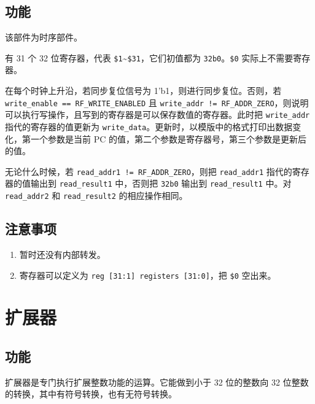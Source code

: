 \documentclass[12pt,AutoFakeBold,AutoFakeSlant]{article}
\providecommand{\tightlist}{%
  \setlength{\itemsep}{0pt}\setlength{\parskip}{0pt}}
\begin{document}
\hypertarget{ux529fux80fd-4}{%
\subsection{功能}\label{ux529fux80fd-4}}

该部件为时序部件。

有 31 个 32 位寄存器，代表
\texttt{\$1}\textasciitilde{}\texttt{\$31}，它们初值都为 \texttt{32\textquotesingle{}b0}。\texttt{\$0} 实际上不需要寄存器。

在每个时钟上升沿，若同步复位信号为 1'b1，则进行同步复位。否则，若 \texttt{write\_enable\ ==\ RF\_WRITE\_ENABLED} 且
\texttt{write\_addr\ !=\ RF\_ADDR\_ZERO}，则说明可以执行写操作，且写到的寄存器是可以保存数值的寄存器。此时把
\texttt{write\_addr} 指代的寄存器的值更新为
\texttt{write\_data}。更新时，以模版中的格式打印出数据变化，第一个参数是当前 PC 的值，第二个参数是寄存器号，第三个参数是更新后的值。

无论什么时候，若 \texttt{read\_addr1\ !=\ RF\_ADDR\_ZERO}，则把
\texttt{read\_addr1} 指代的寄存器的值输出到 \texttt{read\_result1}
中，否则把 \texttt{32\textquotesingle{}b0} 输出到 \texttt{read\_result1} 中。对 \texttt{read\_addr2} 和 \texttt{read\_result2} 的相应操作相同。

\hypertarget{ux6ce8ux610fux4e8bux9879-3}{%
\subsection{注意事项}\label{ux6ce8ux610fux4e8bux9879-3}}

\begin{enumerate}
\def\labelenumi{\arabic{enumi}.}
\tightlist
\item
  暂时还没有内部转发。
\item
  寄存器可以定义为 \texttt{reg\ {[}31:1{]}\ registers\ {[}31:0{]}}，把
  \texttt{\$0} 空出来。
\end{enumerate}

\hypertarget{ux6269ux5c55ux5668}{%
\section{扩展器}\label{ux6269ux5c55ux5668}}

\hypertarget{ux529fux80fd-5}{%
\subsection{功能}\label{ux529fux80fd-5}}

扩展器是专门执行扩展整数功能的运算。它能做到小于 32 位的整数向 32
位整数的转换，其中有符号转换，也有无符号转换。
\end{document}

